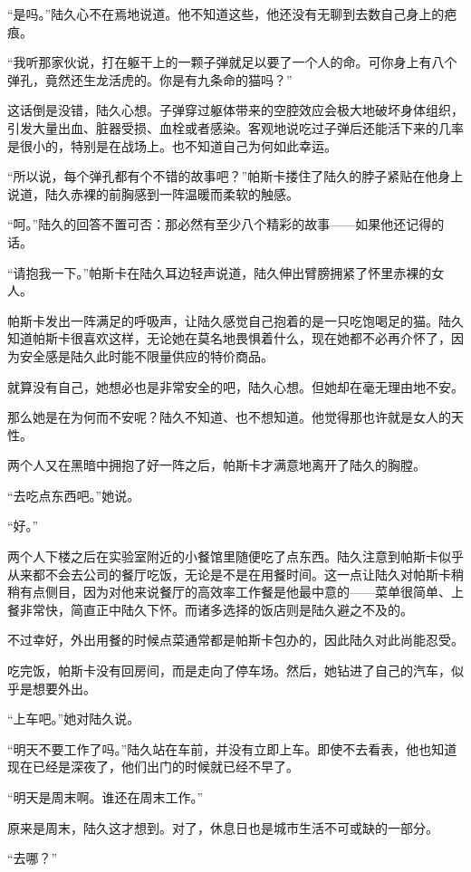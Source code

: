 “是吗。”陆久心不在焉地说道。他不知道这些，他还没有无聊到去数自己身上的疤痕。

“我听那家伙说，打在躯干上的一颗子弹就足以要了一个人的命。可你身上有八个弹孔，竟然还生龙活虎的。你是有九条命的猫吗？”

这话倒是没错，陆久心想。子弹穿过躯体带来的空腔效应会极大地破坏身体组织，引发大量出血、脏器受损、血栓或者感染。客观地说吃过子弹后还能活下来的几率是很小的，特别是在战场上。也不知道自己为何如此幸运。

“所以说，每个弹孔都有个不错的故事吧？”帕斯卡搂住了陆久的脖子紧贴在他身上说道，陆久赤裸的前胸感到一阵温暖而柔软的触感。

“呵。”陆久的回答不置可否：那必然有至少八个精彩的故事——如果他还记得的话。

“请抱我一下。”帕斯卡在陆久耳边轻声说道，陆久伸出臂膀拥紧了怀里赤裸的女人。

帕斯卡发出一阵满足的呼吸声，让陆久感觉自己抱着的是一只吃饱喝足的猫。陆久知道帕斯卡很喜欢这样，无论她在莫名地畏惧着什么，现在她都不必再介怀了，因为安全感是陆久此时能不限量供应的特价商品。

就算没有自己，她想必也是非常安全的吧，陆久心想。但她却在毫无理由地不安。

那么她是在为何而不安呢？陆久不知道、也不想知道。他觉得那也许就是女人的天性。

两个人又在黑暗中拥抱了好一阵之后，帕斯卡才满意地离开了陆久的胸膛。

“去吃点东西吧。”她说。

“好。”

两个人下楼之后在实验室附近的小餐馆里随便吃了点东西。陆久注意到帕斯卡似乎从来都不会去公司的餐厅吃饭，无论是不是在用餐时间。这一点让陆久对帕斯卡稍稍有点侧目，因为对他来说餐厅的高效率工作餐是他最中意的——菜单很简单、上餐非常快，简直正中陆久下怀。而诸多选择的饭店则是陆久避之不及的。

不过幸好，外出用餐的时候点菜通常都是帕斯卡包办的，因此陆久对此尚能忍受。

吃完饭，帕斯卡没有回房间，而是走向了停车场。然后，她钻进了自己的汽车，似乎是想要外出。

“上车吧。”她对陆久说。

“明天不要工作了吗。”陆久站在车前，并没有立即上车。即使不去看表，他也知道现在已经是深夜了，他们出门的时候就已经不早了。

“明天是周末啊。谁还在周末工作。”

原来是周末，陆久这才想到。对了，休息日也是城市生活不可或缺的一部分。

“去哪？”

